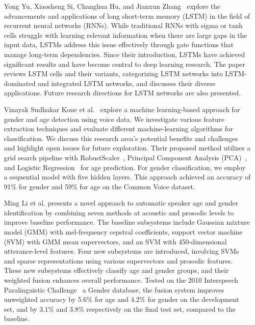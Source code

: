\documentclass[conference, 10pt,onecolumn]{IEEEtran}
\begin{document}
Yong Yu, Xiaosheng Si, Changhua Hu, and Jianxun Zhang~\cite{yu2019review} explore the advancements and applications of long short-term memory (LSTM) in the field of recurrent neural networks (RNNs). While traditional RNNs with sigma or tanh cells struggle with learning relevant information when there are large gaps in the input data, LSTMs address this issue effectively through gate functions that manage long-term dependencies. Since their introduction, LSTMs have achieved significant results and have become central to deep learning research. The paper reviews LSTM cells and their variants, categorizing LSTM networks into LSTM-dominated and integrated LSTM networks, and discusses their diverse applications. Future research directions for LSTM networks are also presented.

Vinayak Sudhakar Kone et al.~\cite{kone2023voice} explore a machine learning-based approach for gender and age detection using voice data. We investigate various feature extraction techniques and evaluate different machine-learning algorithms for classification. We discuss this research area's potential benefits and challenges and highlight open issues for future exploration. Their proposed method utilizes a grid search pipeline with RobustScaler~\cite{qian2022robustscaler}, Principal Component Analysis (PCA)~\cite{abdi2010principal}, and Logistic Regression~\cite{lavalley2008logistic} for age prediction. For gender classification, we employ a sequential model with five hidden layers. This approach achieved an accuracy of 91\% for gender and 59\% for age on the Common Voice dataset.

Ming Li et al. \cite{li2013automatic} presents a novel approach to automatic speaker age and gender identification by combining seven methods at acoustic and prosodic levels to improve baseline performance. The baseline subsystems include Gaussian mixture model (GMM) with mel-frequency cepstral coefficients, support vector machine (SVM) with GMM mean supervectors, and an SVM with 450-dimensional utterance-level features. Four new subsystems are introduced, involving SVMs and sparse representations using various supervectors and prosodic features. These new subsystems effectively classify age and gender groups, and their weighted fusion enhances overall performance. Tested on the 2010 Interspeech Paralinguistic Challenge~\cite{velichko2022complex} a Gender database, the fusion system improves unweighted accuracy by 5.6\% for age and 4.2\% for gender on the development set, and by 3.1\% and 3.8\% respectively on the final test set, compared to the baseline.
\end{document}

